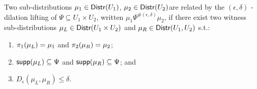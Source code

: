\documentclass{article}
\begin{document}
\begin{defn}
Two sub-distributions $\mu_1 \in \mathsf{Distr}(U_1)$, $\mu_2 \in \mathsf{Distr}(U_2)$are related by the $(\epsilon, \delta)$ - dilation lifting of $\Psi \subseteq U_1 \times U_2$, written $\mu_1 \Psi^{\#(\epsilon, \delta)} \mu_2$, if there exist two witness sub-distributions $\mu_L \in \mathsf{Distr}(U_1 \times U_2)$ and $\mu_R \in \mathsf{Distr}(U_1, U_2)$ s.t.:
\begin{enumerate}
	\item $\pi_1(\mu_L) = \mu_1$ and $\pi_2(\mu_R) = \mu_2$;
	\item $\mathsf{supp}(\mu_L) \subseteq \Psi$ and $\mathsf{supp}(\mu_R) \subseteq \Psi$; and
	\item $D_{\epsilon}(\mu_L, \mu_R) \leq \delta$.
\end{enumerate}
\end{defn}
\end{document}
